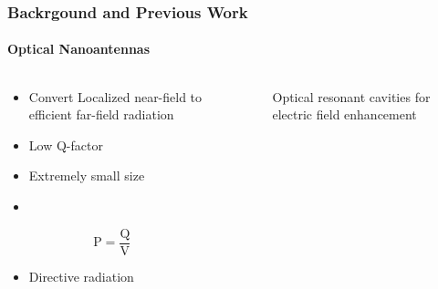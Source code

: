 \documentclass[mathserif,18pt,xcolor=table]{beamer}
\begin{document}
\begin{frame}
  \frametitle{Backrgound and Previous Work}
  \framesubtitle{Optical Nanoantennas}

  \begin{columns} %
    \begin{column}{.45\textwidth}
      \vspace*{-1cm}
      \begin{itemize}
        \item Convert Localized near-field to efficient far-field radiation
        \item Low Q-factor
        \item Extremely small size
        \item \color{red}{High Purcell Factor}
      \end{itemize}
      \begin{equation} \nonumber
        \mathrm{P}  = \frac{\mathrm{Q}}{\mathrm{V}}
      \end{equation}
      \begin{itemize}
        \item Directive radiation
      \end{itemize}
    \end{column}
    \begin{column}{.55\textwidth}
      \vspace*{-1cm}
      \begin{figure}
        \hspace*{-1cm}
        \def\svgwidth{\linewidth}
        
        \caption{Optical resonant cavities for electric field enhancement}
      \end{figure}
      \end{column}%
    \end{columns}
  \end{frame}
\end{document}
